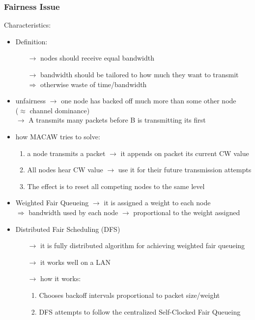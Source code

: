 \subsubsection{Fairness Issue}
Characteristics:
\begin{itemize}
    \item Definition:
    \begin{itemize}
        \item[$\rightarrow$] nodes should receive equal bandwidth
        \item[$\rightarrow$] bandwidth should be tailored to how much they want to transmit\\
        $\Rightarrow$ otherwise waste of time/bandwidth
    \end{itemize}
    \item unfairness $\rightarrow$ one node has backed
    off much more than some other node\\($\approx$ channel dominance)\\
    $\rightarrow$ A transmits many packets before B is transmitting its first
    \item how MACAW tries to solve:
    \begin{enumerate}
        \item a node transmits a packet $\rightarrow$ it appends on packet its current
        CW value
        \item All nodes hear CW value $\rightarrow$ use it for their future
        transmission attempts
        \item The effect is to reset all competing nodes to the same level
    \end{enumerate}
    \item Weighted Fair Queueing $\rightarrow$ it is assigned a weight to each node\\
    $\Rightarrow$ bandwidth used by each node $\rightarrow$ proportional to the weight
    assigned
    \newpage
    \item Distributed Fair Scheduling (DFS)
    \begin{itemize}
        \item[$\rightarrow$] it is fully distributed algorithm for achieving weighted
        fair queueing
        \item[$\rightarrow$] it works well on a LAN
        \item[$\rightarrow$] how it works:
        \begin{enumerate}
            \item Chooses backoff intervals proportional to
            packet size/weight
            \item DFS attempts to follow the centralized Self-Clocked
            Fair Queueing
        \end{enumerate}
    \end{itemize}
\end{itemize}
